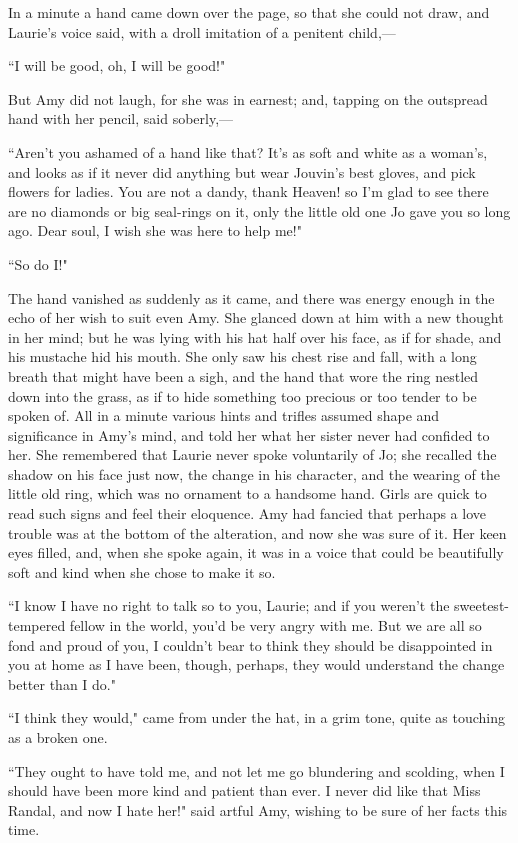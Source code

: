In a minute a hand came down over the page, so that she could not draw,
and Laurie's voice said, with a droll imitation of a
penitent child,---

``I will be good, oh, I will be good!"

But Amy did not laugh, for she was in earnest; and, tapping on the
outspread hand with her pencil, said soberly,---

``Aren't you ashamed of a hand like that?
It's as soft and white as a woman's, and
looks as if it never did anything but wear Jouvin's best
gloves, and pick flowers for ladies. You are not a dandy, thank Heaven!
so I'm glad to see there are no diamonds or big
seal-rings on it, only the little old one Jo gave you so long ago. Dear
soul, I wish she was here to help me!"

``So do I!"

The hand vanished as suddenly as it came, and there was energy enough in
the echo of her wish to suit even Amy. She glanced down at him with a
new thought in her mind; but he was lying with his hat half over his
face, as if for shade, and his mustache hid his mouth. She only saw his
chest rise and fall, with a long breath that might have been a sigh, and
the hand that wore the ring nestled down into the grass, as if to hide
something too precious or too tender to be spoken of. All in a minute
various hints and trifles assumed shape and significance in
Amy's mind, and told her what her sister never had
confided to her. She remembered that Laurie never spoke voluntarily of
Jo; she recalled the shadow on his face just now, the change in his
character, and the wearing of the little old ring, which was no ornament
to a handsome hand. Girls are quick to read such signs and feel their
eloquence. Amy had fancied that perhaps a love trouble was at the bottom
of the alteration, and now she was sure of it. Her keen eyes filled,
and, when she spoke again, it was in a voice that could be beautifully
soft and kind when she chose to make it so.

``I know I have no right to talk so to you, Laurie; and if you
weren't the sweetest-tempered fellow in the world,
you'd be very angry with me. But we are all so fond and
proud of you, I couldn't bear to think they should be
disappointed in you at home as I have been, though, perhaps, they would
understand the change better than I do."

``I think they would," came from under the hat, in a grim tone, quite as
touching as a broken one.

``They ought to have told me, and not let me go blundering and scolding,
when I should have been more kind and patient than ever. I never did
like that Miss Randal, and now I hate her!" said artful Amy, wishing to
be sure of her facts this time.

